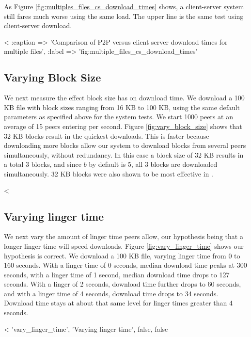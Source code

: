 As Figure \ref{fig:multiples_files_cs_download_times} shows, a client-server system still fares much worse using the same load.  The upper line is the same test using client-server download.

<%
  :caption => 'Comparison of P2P versus client server download times for multiple files', :label => 'fig:multiple_files_cs_download_times' %

\subsection{Varying Block Size}

We next measure the effect block size has on download time. We download a 100 KB file with block sizes ranging from 
16 KB to 100 KB, using the same default parameters as specified above for the system tests.
We start 1000 peers at an average of 15 peers entering per second. Figure \ref{fig:vary_block_size} shows that 32 KB blocks result
in the quickest downloads.  This is faster because downloading more blocks allow our system to download 
blocks from several peers simultaneously, without redundancy.  In this case a block size of 32 KB results in a total 3 blocks, and since $b$ by default is 5, all 3 blocks
are downloaded simultaneously. 32 KB blocks were also shown to be most effective in \cite{TODO}.  

<%

\subsection{Varying linger time}

We next vary the amount of linger time peers allow, our hypothesis being that a longer linger 
time will speed downloads.  Figure \ref{fig:vary_linger_time} shows our hypothesis is correct.   
We download a 100 KB file, varying linger time from 0 to 160 seconds.
With a linger time of 0 seconds, median download time peaks at 300 seconds, with 
a linger time of 1 second, median download time drops to 127 seconds.  With a linger of 2 seconds, download time further drops to 60 seconds, and
with a linger time of 4 seconds, download time drops to 34 seconds.  Download time stays at about that same level for linger times greater than 4 seconds.

<%
 'vary_linger_time', 'Varying linger time', false, false %

